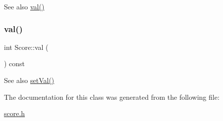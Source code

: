 \begin{DoxySeeAlso}{See also}
\mbox{\hyperlink{class_score_a65da5e3eee257fbd78e429c8491deced}{val()}} 
\end{DoxySeeAlso}
\mbox{\label{class_score_a65da5e3eee257fbd78e429c8491deced}} 
\subsubsection{\texorpdfstring{val()}{val()}}
{\footnotesize\ttfamily int Score\+::val (\begin{DoxyParamCaption}{ }\end{DoxyParamCaption}) const\hspace{0.3cm}{\ttfamily [inline]}}

\begin{DoxySeeAlso}{See also}
\mbox{\hyperlink{class_score_a7327b27227ff3a060036a387d9df81f4}{set\+Val()}} 
\end{DoxySeeAlso}


The documentation for this class was generated from the following file\+:\begin{DoxyCompactItemize}
\item 
\mbox{\hyperlink{score_8h}{score.\+h}}\end{DoxyCompactItemize}
